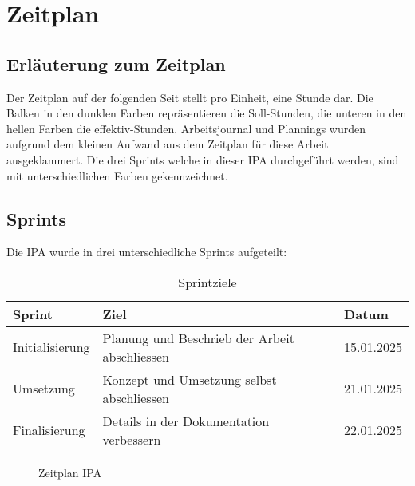 \chapter{Zeitplan}

\section{Erläuterung zum Zeitplan}
Der Zeitplan auf der folgenden Seit stellt pro Einheit, eine Stunde dar. Die Balken in den
dunklen Farben repräsentieren die Soll-Stunden, die unteren in den hellen Farben die effektiv-Stunden.
Arbeitsjournal und Plannings wurden aufgrund dem kleinen Aufwand aus dem Zeitplan für diese Arbeit ausgeklammert.
Die drei Sprints welche in dieser IPA durchgeführt werden, sind mit unterschiedlichen Farben gekennzeichnet.

\section{Sprints}
Die IPA wurde in drei unterschiedliche Sprints aufgeteilt: 

\begin{table}[h!]
  \begin{tabular}{|L{0.3\textwidth}|L{0.4\textwidth}|L{0.3\textwidth}|}
      \hline
       \color{white}\textbf{Sprint} & \color{white}\textbf{Ziel} & \color{white}\textbf{Datum} \\[12pt]
      \hline
      Initialisierung & Planung und Beschrieb der Arbeit abschliessen & 15.01.2025 \\
     \hline
     Umsetzung & Konzept und Umsetzung selbst abschliessen & 21.01.2025 \\
     \hline
     Finalisierung & Details in der Dokumentation verbessern & 22.01.2025 \\
     \hline
    \end{tabular}
    \caption{Sprintziele}
\end{table}

\newpage

\storeareas\zeitplan
{}
\areaset
  {\dimexpr\the\paperwidth-1cm\relax}%
  {\dimexpr\the\paperheight-5.5cm\relax}%
\recalctypearea

\begin{figure}[htp] 
  \caption{Zeitplan IPA}
\end{figure}

\restoregeometry
\zeitplan
\newpage

